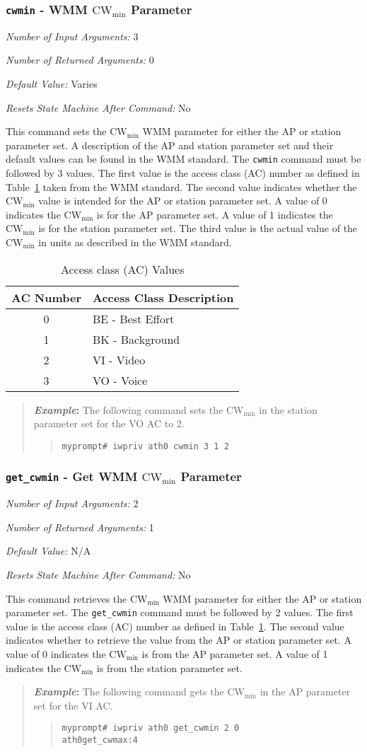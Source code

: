 \documentclass[10pt,fullpage]{article}
\newcommand{\mytt}[1]{{\texttt{#1}}}
\newcommand{\bv}{\begin{verse}}
\newcommand{\ev}{\end{verse}}
\newcommand{\cmd}[1]{{\texttt{myprompt\# #1}}}
\newcommand{\argdesc}[4]{\begin{description}
\itemsep -6pt
\item \textit{Number of Input Arguments:} #1
\item \textit{Number of Returned Arguments:} #2
\item \textit{Default Value:} #3
\item \textit{Resets State Machine After Command:} #4
\end{description}
}
\newenvironment{example}{\begin{quote}\textbf{\textit{Example}:}}{\end{quote}}
\begin{document}
\subsubsection{\mytt{cwmin} - WMM $\mathrm{CW}_{\mathrm{min}}$ Parameter}
\argdesc{3}{0}{Varies}{No}
This command sets the $\mathrm{CW}_{\mathrm{min}}$ WMM parameter for
either the AP or station parameter set.  A description of the AP and
station parameter set and their default values can be found in the WMM
standard.  The \mytt{cwmin} command must be followed by 3 values.  The
first value is the access class (AC) number as defined in
Table~\ref{tab:acvalues} taken from the WMM standard.  The second
value indicates whether the $\mathrm{CW}_{\mathrm{min}}$ value is
intended for the AP or station parameter set.  A value of 0 indicates
the $\mathrm{CW}_{\mathrm{min}}$ is for the AP parameter set.  A value
of 1 indicates the $\mathrm{CW}_{\mathrm{min}}$ is for the station
parameter set.  The third value is the actual value of the
$\mathrm{CW}_{\mathrm{min}}$ in units as described in the WMM
standard.
\begin{table}[h*]
  \centering
  \begin{tabular}{|c|l|} \hline
    AC Number & Access Class Description \\ \hline
    0 & BE - Best Effort \\
    1 & BK - Background \\
    2 & VI - Video \\
    3 & VO - Voice \\ \hline
  \end{tabular}
  \caption{Access class (AC) Values}
  \label{tab:acvalues}
\end{table}
\begin{example}
  The following command sets the $\mathrm{CW}_{\mathrm{min}}$ in the
  station parameter set for the VO AC to 2.
  \bv
  \cmd{iwpriv ath0 cwmin 3 1 2}
  \ev
\end{example}

\subsubsection{\mytt{get\_cwmin} - Get WMM $\mathrm{CW}_{\mathrm{min}}$ Parameter}
\argdesc{2}{1}{N/A}{No}
This command retrieves the $\mathrm{CW}_{\mathrm{min}}$ WMM parameter
for either the AP or station parameter set.  The \mytt{get\_cwmin}
command must be followed by 2 values.  The first value is the access
class (AC) number as defined in Table~\ref{tab:acvalues}.  The second
value indicates whether to retrieve the value from the AP or station
parameter set.  A value of 0 indicates the
$\mathrm{CW}_{\mathrm{min}}$ is from the AP parameter set.  A value of
1 indicates the $\mathrm{CW}_{\mathrm{min}}$ is from the station
parameter set.
\begin{example}
  The following command gets the $\mathrm{CW}_{\mathrm{min}}$ in the
  AP parameter set for the VI AC.
  \bv
  \cmd{iwpriv ath0 get\_cwmin 2 0}\\
  \mytt{ath0\hspace{32pt}get\_cwmax:4}
\ev
\end{example}
\end{document}
